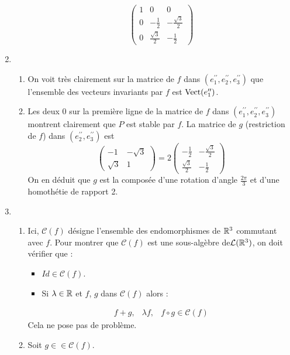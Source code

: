 \begin{enumerate}
\begin{enumerate}
\[\left( \begin{array}{ccc}
 1 & 0 & 0 \\
0 & -\frac{1}{2} & -\frac{\sqrt{3}}{2} \\
0 & \frac{\sqrt{3}}{2} & -\frac{1}{2}
 \end{array}\right) \]
\end{enumerate}
\item \begin{enumerate}
 \item On voit très clairement sur la matrice de $f$ dans $(e^{\prime\prime}_1,e^{\prime\prime}_2,e^{\prime\prime}_3)$ que l'ensemble des vecteurs invariants par $f$ est $\operatorname{Vect} (e^{\prime\prime}_1)$.
\item Les deux $0$ sur la première ligne de la matrice de $f$ dans $(e^{\prime\prime}_1,e^{\prime\prime}_2,e^{\prime\prime}_3)$ montrent clairement que $P$ est stable par $f$.\newline
La matrice de $g$ (restriction de $f$) dans $(e^{\prime\prime}_2,e^{\prime\prime}_3)$ est
\[\left( \begin{array}{cc}
-1 & -\sqrt{3}\\
\sqrt{3} & 1
         \end{array}\right)=
2\left( \begin{array}{cc}
-\frac{1}{2} & -\frac{\sqrt{3}}{2}\\
\frac{\sqrt{3}}{2} & -\frac{1}{2}
         \end{array}\right) \]
On en déduit que $g$ est la composée d'une rotation d'angle $\frac{2\pi}{3}$ et d'une homothétie de rapport 2.
\end{enumerate}
\item \begin{enumerate}
 \item Ici,  $\mathcal{C}(f)$ désigne l'ensemble des endomorphismes de $\mathbb{R}^3$ commutant avec $f$. Pour montrer que $\mathcal{C}(f)$ est une sous-algèbre de$\mathcal{L}(\mathbb{R}^3)$, on doit vérifier que :
\begin{itemize}
 \item $Id \in \mathcal{C}(f)$.
\item Si $\lambda\in \mathbb{R}$ et $f$, $g$ dans $\mathcal{C}(f)$ alors :
\end{itemize}
\begin{eqnarray*}
 f+g ,& \lambda f ,& f\circ g \in \mathcal{C}(f)
\end{eqnarray*}
Cela ne pose pas de problème.
\item Soit $g\in \in \mathcal{C}(f)$.
\begin{enumerate}

\end{enumerate}
\end{enumerate}
\end{enumerate}
